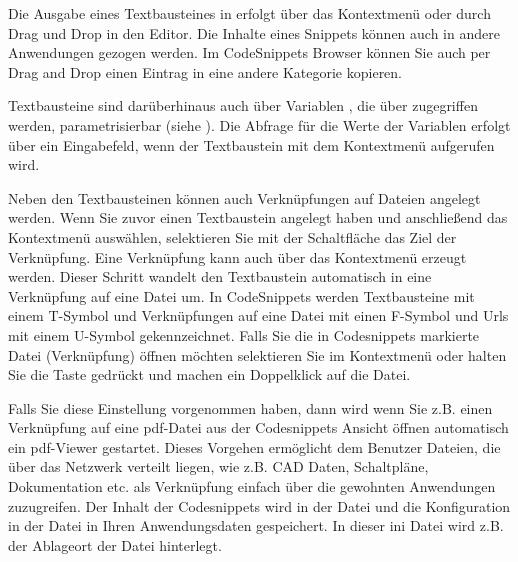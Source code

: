 
Die Ausgabe eines Textbausteines in \codeblocks erfolgt über das Kontextmenü  oder durch Drag und Drop in den Editor. Die Inhalte eines Snippets können auch in andere Anwendungen gezogen werden. Im CodeSnippets Browser können Sie auch per Drag and Drop einen Eintrag in eine andere Kategorie kopieren.

Textbausteine sind darüberhinaus auch über Variablen , die über  zugegriffen werden, parametrisierbar (siehe ). Die Abfrage für die Werte der Variablen erfolgt über ein Eingabefeld, wenn der Textbaustein mit dem Kontextmenü  aufgerufen wird.

Neben den Textbausteinen können auch Verknüpfungen auf Dateien angelegt werden. Wenn Sie zuvor einen Textbaustein angelegt haben und anschließend das Kontextmenü  auswählen, selektieren Sie mit der Schaltfläche  das Ziel der Verknüpfung. Eine Verknüpfung kann auch über das Kontextmenü  erzeugt werden. Dieser Schritt wandelt den Textbaustein automatisch in eine Verknüpfung auf eine Datei um. In CodeSnippets werden Textbausteine mit einem T-Symbol und Verknüpfungen auf eine Datei mit einen F-Symbol und Urls mit einem U-Symbol gekennzeichnet. Falls Sie die in Codesnippets markierte Datei (Verknüpfung) öffnen möchten selektieren Sie im Kontextmenü  oder halten Sie die  Taste gedrückt und machen ein Doppelklick auf die Datei.


Falls Sie diese Einstellung vorgenommen haben, dann wird wenn Sie z.B. einen Verknüpfung auf eine pdf-Datei aus der Codesnippets Ansicht öffnen automatisch ein pdf-Viewer gestartet. Dieses Vorgehen ermöglicht dem Benutzer Dateien, die über das Netzwerk verteilt liegen, wie z.B. CAD Daten, Schaltpläne, Dokumentation etc. als Verknüpfung einfach über die gewohnten Anwendungen zuzugreifen. Der Inhalt der Codesnippets wird in der Datei  und die Konfiguration in der Datei  in Ihren Anwendungsdaten gespeichert. In dieser ini Datei wird z.B. der Ablageort der Datei  hinterlegt.

